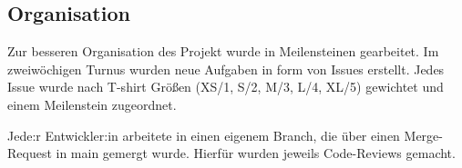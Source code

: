 \subsection[Organisation]{Organisation } \label{control/orga}

Zur besseren Organisation des Projekt wurde in Meilensteinen gearbeitet. Im zweiwöchigen Turnus wurden neue Aufgaben in form von Issues erstellt. Jedes Issue wurde nach T-shirt Größen  (XS/1, S/2, M/3, L/4, XL/5) gewichtet und einem Meilenstein zugeordnet.

Jede:r Entwickler:in arbeitete in einen eigenem Branch, die über einen Merge-Request in main gemergt wurde. Hierfür wurden jeweils Code-Reviews gemacht.
